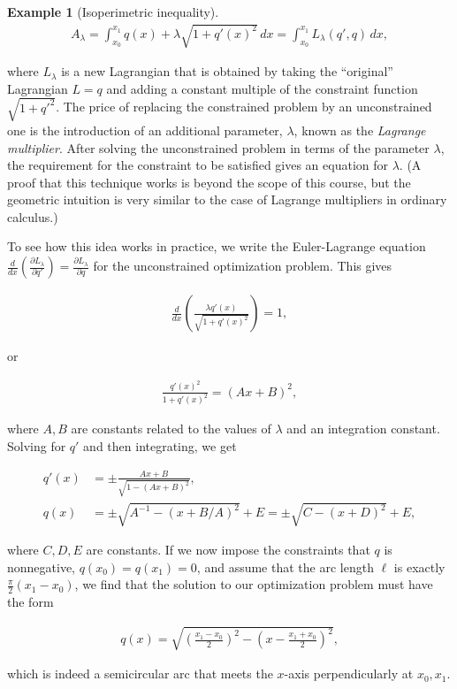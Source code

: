 \documentclass[11pt]{report}
\theoremstyle{plain}
\theoremstyle{definition}
\newtheorem{example}[thm]{Example}
\begin{document}
\begin{example}[Isoperimetric inequality]
\begin{align*}
A_\lambda = \int_{x_0}^{x_1} q(x) + \lambda \sqrt{1+q'(x)^2}\,dx
= \int_{x_0}^{x_1} L_\lambda(q',q)\,dx,
\end{align*}

where $L_\lambda$ is a new Lagrangian that is
obtained by taking the ``original'' Lagrangian $L=q$
and adding a constant multiple of the constraint
function $\sqrt{1+q'^2}$. The price of replacing the
constrained problem by an unconstrained one is the
introduction of an additional parameter, $\lambda$,
known as the \emph{Lagrange multiplier}. After solving the
unconstrained problem in terms of the parameter
$\lambda$, the requirement for the constraint to be
satisfied gives an equation for $\lambda$. (A proof
that this technique works is beyond the scope of this
course, but the geometric intuition is very similar to
the case of Lagrange multipliers in ordinary
calculus.)

To see how this idea works in practice, we write the
Euler-Lagrange equation
$\frac{d}{dx}\left(\frac{\partial L_\lambda}{\partial
q'}\right) = \frac{\partial L_\lambda}{\partial q}$
for the unconstrained optimization problem. This gives

\begin{align*}
\frac{d}{dx}\left( \frac{\lambda q'(x)}{\sqrt{1+q'(x)^2}}\right) = 1,
\end{align*}

or

\begin{align*}
\frac{q'(x)^2}{1+q'(x)^2} = (Ax+B)^2,
\end{align*}

where $A,B$ are constants related to the values of
$\lambda$ and an integration constant. Solving for
$q'$ and then integrating, we get

\begin{align*}
q'(x) &= \pm \frac{Ax+B}{\sqrt{1-(Ax+B)^2}}, \\
q(x) &= \pm \sqrt{A^{-1}-(x+B/A)^2}+E = \pm \sqrt{C-(x+D)^2} + E,
\end{align*}

where $C,D,E$ are constants. If we now impose the
constraints that $q$ is nonnegative,
$q(x_0)=q(x_1)=0$, and assume that the arc length
$\ell$ is exactly $\frac{\pi}{2}(x_1-x_0)$, we find
that the solution to our optimization problem must
have the form

\begin{align*}
q(x) = \sqrt{\left(\frac{x_1-x_0}{2}\right)^2 - \left(x-\frac{x_1+x_0}{2}\right)^2},
\end{align*}

which is indeed a semicircular arc that meets the
$x$-axis perpendicularly at $x_0,x_1$.
\end{example}
\end{document}
